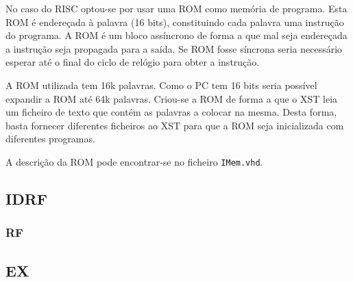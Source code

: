 \documentclass[a4paper]{article}
\begin{document}
			No caso do \textmu RISC optou-se por usar uma ROM como memória de programa. Esta ROM é endereçada à palavra (16 bits), constituindo cada palavra uma instrução do programa. A ROM é um bloco assíncrono de forma a que mal seja endereçada a instrução seja propagada para a saída. Se ROM fosse síncrona seria necessário esperar até o final do ciclo de relógio para obter a instrução.
			
			A ROM utilizada tem 16k palavras. Como o PC tem 16 bits seria possível expandir a ROM até 64k palavras. Criou-se a ROM de forma a que o XST leia um ficheiro de texto que contém as palavras a colocar na mesma. Desta forma, basta fornecer diferentes ficheiros ao XST para que a ROM seja inicializada com diferentes programas.
			
			A descrição da ROM pode encontrar-se no ficheiro \texttt{IMem.vhd}.


		\subsection{IDRF}
			
			
			
			
			
			\subsubsection{RF}
			
		\subsection{EX}
		
\end{document}
